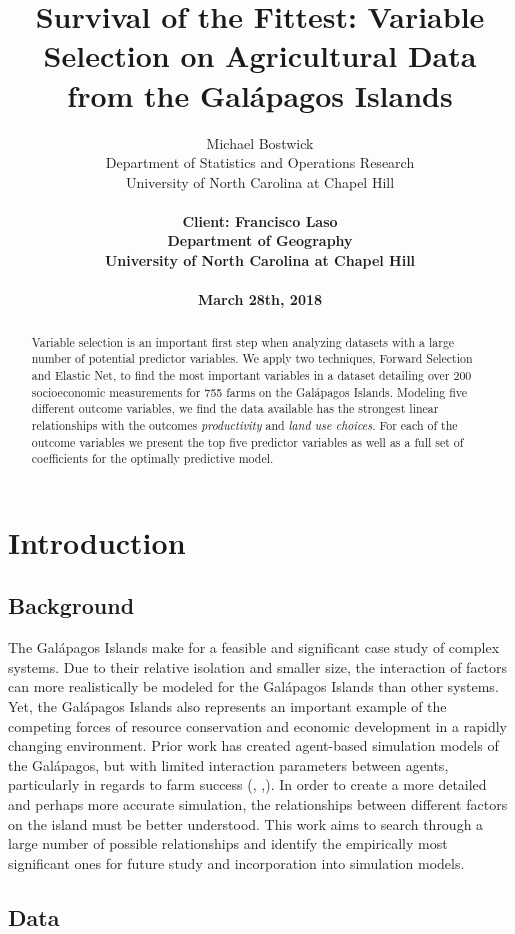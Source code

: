 \documentclass{article}
\title{Survival of the Fittest: Variable Selection on Agricultural Data from the Gal\'apagos Islands}
\author{
  Michael Bostwick\\
  Department of Statistics and Operations Research\\
  University of North Carolina at Chapel Hill\\
	\\
  \bf{Client: Francisco Laso} \\
  Department of Geography \\
  University of North Carolina at Chapel Hill\\
  \\
  March 28th, 2018 \\
}
\begin{document}
\maketitle
\begin{abstract}
  Variable selection is an important first step when analyzing datasets with a large number of potential predictor variables. We 
  apply two techniques, Forward Selection and Elastic Net,  to find the most important variables in a dataset detailing over 200 
  socioeconomic measurements for 755 farms on the Gal\'apagos Islands. Modeling five different outcome variables, we find 
  the data available has the strongest linear relationships with the outcomes \textit{productivity} and \textit{land use choices}. For each of 
  the outcome variables we present the top five predictor variables as well as a full set of coefficients for the optimally predictive 
  model.
  \end{abstract}

\section{Introduction}

\subsection{Background}

The Gal\'apagos Islands make for a feasible and significant case study of complex systems. Due to their relative isolation and smaller size, the interaction of factors can more realistically be modeled for the Gal\'apagos Islands than other systems. Yet, the Gal\'apagos Islands also represents an important example of the competing forces of resource conservation and economic development in a rapidly changing environment. Prior work has created agent-based simulation models of the Gal\'apagos, but with limited interaction parameters between agents, particularly in regards to farm success (\cite{miller}, \cite{valdivia},\cite{walsh}). In order to create a more detailed and perhaps more accurate simulation, the relationships between different factors on the island must be better understood. This work aims to search through a large number of possible relationships and identify the empirically most significant ones for future study and incorporation into simulation models. 

\subsection{Data}
\end{document}
